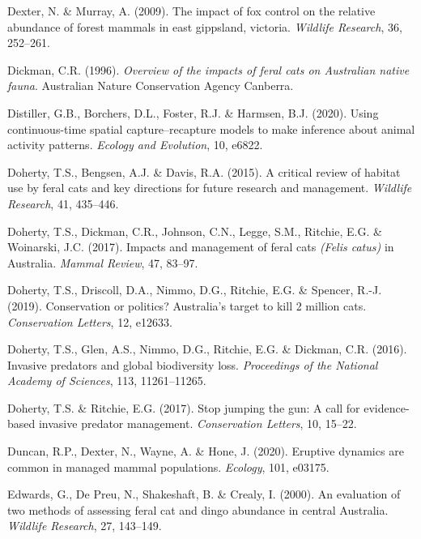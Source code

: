 \documentclass[11pt,a4paper,titlepage,twoside,openright]{style/unimelbthesis}
\begin{document}
\begin{mainmatter}
\leavevmode\hypertarget{ref-dexter2009impact}{}%
Dexter, N. \& Murray, A. (2009). The impact of fox control on the relative abundance of forest mammals in east gippsland, victoria. \emph{Wildlife Research}, 36, 252--261.

\leavevmode\hypertarget{ref-dickman1996overview}{}%
Dickman, C.R. (1996). \emph{Overview of the impacts of feral cats on Australian native fauna}. Australian Nature Conservation Agency Canberra.

\leavevmode\hypertarget{ref-distiller2020using}{}%
Distiller, G.B., Borchers, D.L., Foster, R.J. \& Harmsen, B.J. (2020). Using continuous-time spatial capture--recapture models to make inference about animal activity patterns. \emph{Ecology and Evolution}, 10, e6822.

\leavevmode\hypertarget{ref-doherty2015critical}{}%
Doherty, T.S., Bengsen, A.J. \& Davis, R.A. (2015). A critical review of habitat use by feral cats and key directions for future research and management. \emph{Wildlife Research}, 41, 435--446.

\leavevmode\hypertarget{ref-doherty2017impacts}{}%
Doherty, T.S., Dickman, C.R., Johnson, C.N., Legge, S.M., Ritchie, E.G. \& Woinarski, J.C. (2017). Impacts and management of feral cats \emph{(Felis catus)} in Australia. \emph{Mammal Review}, 47, 83--97.

\leavevmode\hypertarget{ref-doherty2019conservation}{}%
Doherty, T.S., Driscoll, D.A., Nimmo, D.G., Ritchie, E.G. \& Spencer, R.-J. (2019). Conservation or politics? Australia's target to kill 2 million cats. \emph{Conservation Letters}, 12, e12633.

\leavevmode\hypertarget{ref-doherty2016invasive}{}%
Doherty, T.S., Glen, A.S., Nimmo, D.G., Ritchie, E.G. \& Dickman, C.R. (2016). Invasive predators and global biodiversity loss. \emph{Proceedings of the National Academy of Sciences}, 113, 11261--11265.

\leavevmode\hypertarget{ref-doherty2017stop}{}%
Doherty, T.S. \& Ritchie, E.G. (2017). Stop jumping the gun: A call for evidence-based invasive predator management. \emph{Conservation Letters}, 10, 15--22.

\leavevmode\hypertarget{ref-duncan2020eruptive}{}%
Duncan, R.P., Dexter, N., Wayne, A. \& Hone, J. (2020). Eruptive dynamics are common in managed mammal populations. \emph{Ecology}, 101, e03175.

\leavevmode\hypertarget{ref-edwards2000evaluation}{}%
Edwards, G., De Preu, N., Shakeshaft, B. \& Crealy, I. (2000). An evaluation of two methods of assessing feral cat and dingo abundance in central Australia. \emph{Wildlife Research}, 27, 143--149.


\end{mainmatter}
\end{document}
